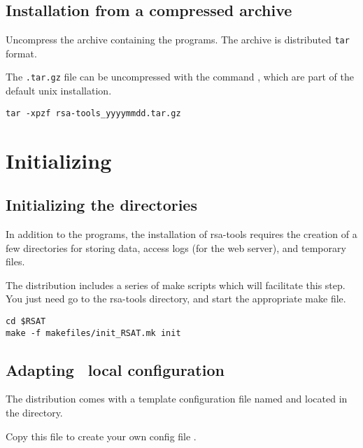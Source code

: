 \documentclass[12pt,a4paper, oneside]{scrreprt} %
\begin{document}
\section{Installation from a compressed archive}

Uncompress the archive containing the programs. The archive is
distributed \texttt{tar} format.

The \texttt{.tar.gz} file can be uncompressed with the command
, which are part of the default unix installation.

\begin{lstlisting}
tar -xpzf rsa-tools_yyyymmdd.tar.gz
\end{lstlisting}

\chapter{Initializing \RSAT}




\section{Initializing the directories}

In addition to the programs, the installation of rsa-tools requires
the creation of a few directories for storing data, access logs (for
the web server), and temporary files.

The distribution includes a series of make scripts which will
facilitate this step. You just need go to the rsa-tools directory, and
start the appropriate make file.

\begin{lstlisting}
cd $RSAT
make -f makefiles/init_RSAT.mk init
\end{lstlisting}



\section{Adapting \RSAT \  local configuration}

The \RSAT distribution comes with a template configuration file named
 and located in the 
directory.

Copy this file to create your own config file .
\end{document}
